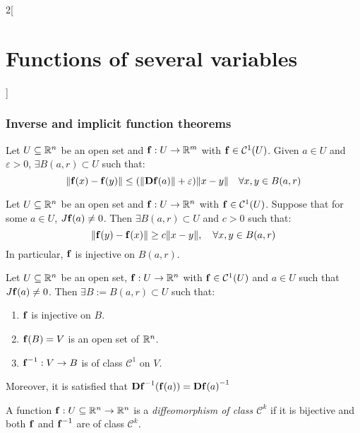 \documentclass[../../../main.tex]{subfiles}
\begin{document}
\begin{multicols}{2}[\section{Functions of several variables}]
    \subsubsection*{Inverse and implicit function theorems}
    \begin{lemma}
        Let $U\subseteq\mathbb{R}^n$ be an open set and $\boldsymbol{\mathrm{f}}:U\rightarrow\mathbb{R}^m$ with $\boldsymbol{\mathrm{f}}\in \mathcal{C}^1(U)$. Given $a\in U$ and $\varepsilon>0$, $\exists B(a,r)\subset U$ such that: $$\|\boldsymbol{\mathrm{f}}(x)-\boldsymbol{\mathrm{f}}(y)\|\leq(\|\boldsymbol{\mathrm{Df}}(a)\|+\varepsilon)\|x-y\|\quad\forall x,y\in B(a,r)$$
    \end{lemma}
    \begin{lemma}
        Let $U\subseteq\mathbb{R}^n$ be an open set and $\boldsymbol{\mathrm{f}}:U\rightarrow\mathbb{R}^n$ with $\boldsymbol{\mathrm{f}}\in \mathcal{C}^1(U)$. Suppose that for some $a\in U$, $J\boldsymbol{\mathrm{f}}(a)\ne 0$. Then $\exists B(a,r)\subset U$ and $c>0$ such that: $$\|\boldsymbol{\mathrm{f}}(y)-\boldsymbol{\mathrm{f}}(x)\|\geq c\|x-y\|,\quad\forall x,y\in B(a,r)$$ In particular, $\boldsymbol{\mathrm{f}}$ is injective on $B(a,r)$.
    \end{lemma}
    \begin{theorem}
        Let $U\subseteq\mathbb{R}^n$ be an open set, $\boldsymbol{\mathrm{f}}:U\rightarrow\mathbb{R}^n$ with $\boldsymbol{\mathrm{f}}\in \mathcal{C}^1(U)$ and $a\in U$ such that $J\boldsymbol{\mathrm{f}}(a)\ne0$. Then $\exists B:=B(a,r)\subset U$ such that:
        \begin{enumerate}
            \item $\boldsymbol{\mathrm{f}}$ is injective on $B$.
            \item $\boldsymbol{\mathrm{f}}(B)=V$ is an open set of $\mathbb{R}^n$.
            \item $\boldsymbol{\mathrm{f}}^{-1}:V\rightarrow B$ is of class $\mathcal{C}^1$ on $V$.
        \end{enumerate} Moreover, it is satisfied that $\boldsymbol{\mathrm{D}}{\boldsymbol{\mathrm{f}}}^{-1}(\boldsymbol{\mathrm{f}}(a))={\boldsymbol{\mathrm{Df}}(a)}^{-1}$
    \end{theorem}
    \begin{definition}
        A function $\boldsymbol{\mathrm{f}}:U\subseteq\mathbb{R}^n\rightarrow\mathbb{R}^n$ is a \textit{diffeomorphism of class $\mathcal{C}^k$} if it is bijective and both $\boldsymbol{\mathrm{f}}$ and $\boldsymbol{\mathrm{f}}^{-1}$ are of class $\mathcal{C}^k$.
    \end{definition}
    \begin{theorem}

\end{theorem}
\end{multicols}
\end{document}
